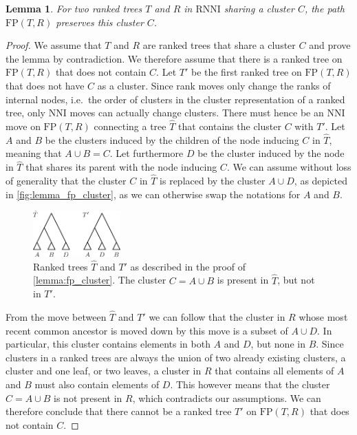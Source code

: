 \documentclass[11pt]{amsart}
\newtheorem{lemma}{Lemma}
\newcommand{\rnni}{\mathrm{RNNI}}
\newcommand{\nni}{\mathrm{NNI}}
\newcommand{\fp}{\mathrm{FP}}
\begin{document}
\begin{lemma}
	For two ranked trees $T$ and $R$ in $\rnni$ sharing a cluster $C$, the path $\fp(T,R)$ preserves this cluster $C$.
	\label{lemma:fp_cluster}
\end{lemma}

\begin{proof}
	We assume that $T$ and $R$ are ranked trees that share a cluster $C$ and prove the lemma by contradiction.
	We therefore assume that there is a ranked tree on $\fp(T,R)$ that does not contain $C$.
	Let $T'$ be the first ranked tree on $\fp(T,R)$ that does not have $C$ as a cluster.
	Since rank moves only change the ranks of internal nodes, i.e.\ the order of clusters in the cluster representation of a ranked tree, only $\nni$ moves can actually change clusters.
	There must hence be an $\nni$ move on $\fp(T,R)$ connecting a tree $\hat T$ that contains the cluster $C$ with $T'$.
	Let $A$ and $B$ be the clusters induced by the children of the node inducing $C$ in $\hat T$, meaning that $A \cup B = C$.
	Let furthermore $D$ be the cluster induced by the node in $\hat T$ that shares its parent with the node inducing $C$.
	We can assume without loss of generality that the cluster $C$ in $\hat T$ is replaced by the cluster $A \cup D$, as depicted in \autoref{fig:lemma_fp_cluster}, as we can otherwise swap the notations for $A$ and $B$.

	\begin{figure}[ht]
		\includegraphics[width=0.3\textwidth]{fp_cluster.eps}
		\caption{Ranked trees $\hat T$ and $T'$ as described in the proof of \autoref{lemma:fp_cluster}.
		The cluster $C = A \cup B$ is present in $\hat T$, but not in $T'$.}
		\label{fig:lemma_fp_cluster}
	\end{figure}

	From the move between $\hat T$ and $T'$ we can follow that the cluster in $R$ whose most recent common ancestor is moved down by this move is a subset of $A \cup D$.
	In particular, this cluster contains elements in both $A$ and $D$, but none in $B$.
	Since clusters in a ranked trees are always the union of two already existing clusters, a cluster and one leaf, or two leaves, a cluster in $R$ that contains all elements of $A$ and $B$ must also contain elements of $D$.
	This however means that the cluster $C = A \cup B$ is not present in $R$, which contradicts our assumptions.
	We can therefore conclude that there cannot be a ranked tree $T'$ on $\fp(T,R)$ that does not contain $C$.
\end{proof}
\end{document}
